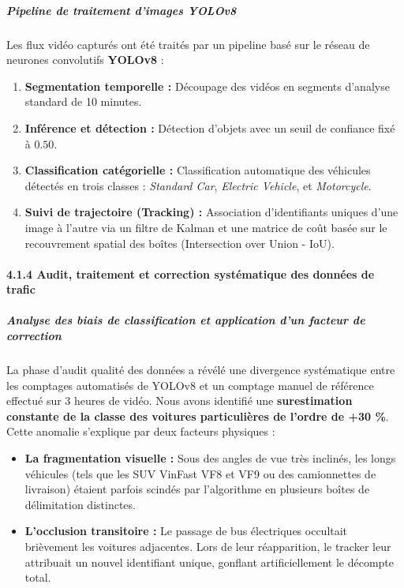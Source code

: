 \documentclass[10pt, a4paper]{article}
\providecommand{\tightlist}{}
\begin{document}
\subparagraph{Pipeline de traitement d'images
YOLOv8}\label{pipeline-de-traitement-dimages-yolov8}

Les flux vidéo capturés ont été traités par un pipeline basé sur le
réseau de neurones convolutifs \textbf{YOLOv8} :

\begin{enumerate}
\def\labelenumi{\arabic{enumi}.}
\tightlist
\item
  \textbf{Segmentation temporelle :} Découpage des vidéos en segments
  d'analyse standard de 10 minutes.
\item
  \textbf{Inférence et détection :} Détection d'objets avec un seuil de
  confiance fixé à \(0.50\).
\item
  \textbf{Classification catégorielle :} Classification automatique des
  véhicules détectés en trois classes : \emph{Standard Car},
  \emph{Electric Vehicle}, et \emph{Motorcycle}.
\item
  \textbf{Suivi de trajectoire (Tracking) :} Association d'identifiants
  uniques d'une image à l'autre via un filtre de Kalman et une matrice
  de coût basée sur le recouvrement spatial des boîtes (Intersection
  over Union - IoU).
\end{enumerate}

\paragraph{4.1.4 Audit, traitement et correction systématique des
données de
trafic}\label{audit-traitement-et-correction-systuxe9matique-des-donnuxe9es-de-trafic}

\subparagraph{Analyse des biais de classification et application d'un
facteur de
correction}\label{analyse-des-biais-de-classification-et-application-dun-facteur-de-correction}

La phase d'audit qualité des données a révélé une divergence
systématique entre les comptages automatisés de YOLOv8 et un comptage
manuel de référence effectué sur 3 heures de vidéo. Nous avons identifié
une \textbf{surestimation constante de la classe des voitures
particulières de l'ordre de +30 \%}. Cette anomalie s'explique par deux
facteurs physiques :

\begin{itemize}
\tightlist
\item
  \textbf{La fragmentation visuelle :} Sous des angles de vue très
  inclinés, les longs véhicules (tels que les SUV VinFast VF8 et VF9 ou
  des camionnettes de livraison) étaient parfois scindés par
  l'algorithme en plusieurs boîtes de délimitation distinctes.
\item
  \textbf{L'occlusion transitoire :} Le passage de bus électriques
  occultait brièvement les voitures adjacentes. Lors de leur
  réapparition, le tracker leur attribuait un nouvel identifiant unique,
  gonflant artificiellement le décompte total.
\end{itemize}
\end{document}

